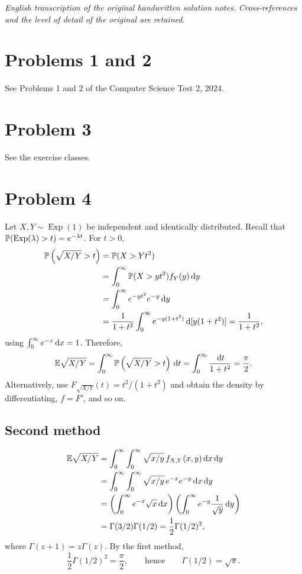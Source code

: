 \documentclass[11pt,a4paper]{article}
\begin{document}
\noindent\emph{English transcription of the original handwritten solution notes. Cross-references and the level of detail of the original are retained.}

\section*{Problems 1 and 2}
See Problems 1 and 2 of the Computer Science Test 2, 2024.

\section*{Problem 3}
See the exercise classes.

\section*{Problem 4}
Let $X,Y\sim\operatorname{Exp}(1)$ be independent and identically distributed.
Recall that $\P(\operatorname{Exp}(\lambda)>t)=e^{-\lambda t}$.
For $t>0$,
\begin{align*}
\P\left(\sqrt{X/Y}>t\right)
&=\P(X>Yt^2)\\
&=\int_0^\infty\P(X>yt^2)f_Y(y)\d y\\
&=\int_0^\infty e^{-yt^2}e^{-y}\d y\\
&=\frac1{1+t^2}\int_0^\infty e^{-y(1+t^2)}\d[y(1+t^2)]
=\frac1{1+t^2},
\end{align*}
using $\int_0^\infty e^{-x}\d x=1$. Therefore,
\[
\E\sqrt{X/Y}=\int_0^\infty\P\left(\sqrt{X/Y}>t\right)\d t
=\int_0^\infty\frac{\d t}{1+t^2}=\frac\pi2.
\]
Alternatively, use $F_{\sqrt{X/Y}}(t)=t^2/(1+t^2)$ and obtain the density by differentiating, $f=F'$, and so on.

\subsection*{Second method}
\begin{align*}
\E\sqrt{X/Y}
&=\int_0^\infty\int_0^\infty\sqrt{x/y}\,f_{X,Y}(x,y)\d x\d y\\
&=\int_0^\infty\int_0^\infty\sqrt{x/y}\,e^{-x}e^{-y}\d x\d y\\
&=\left(\int_0^\infty e^{-x}\sqrt x\d x\right)
\left(\int_0^\infty e^{-y}\frac1{\sqrt y}\d y\right)\\
&=\Gamma(3/2)\Gamma(1/2)=\frac12\Gamma(1/2)^2,
\end{align*}
where $\Gamma(z+1)=z\Gamma(z)$. By the first method,
\[
\frac12\Gamma(1/2)^2=\frac\pi2,
\qquad\text{hence}\qquad\Gamma(1/2)=\sqrt\pi.
\]
\end{document}
